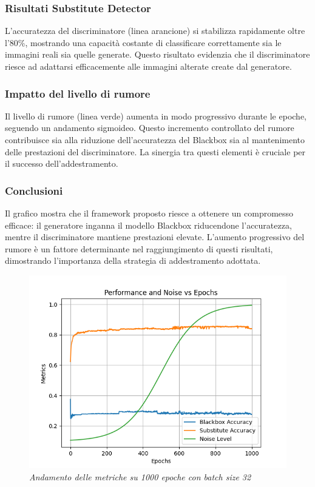 \subsubsection{Risultati Substitute Detector}
L'accuratezza del discriminatore (linea arancione) si stabilizza rapidamente oltre l'80\%, mostrando una capacità costante di classificare correttamente sia le immagini reali sia quelle generate. Questo risultato evidenzia che il discriminatore riesce ad adattarsi efficacemente alle immagini alterate create dal generatore.

\subsubsection{Impatto del livello di rumore}
Il livello di rumore (linea verde) aumenta in modo progressivo durante le epoche, seguendo un andamento sigmoideo. Questo incremento controllato del rumore contribuisce sia alla riduzione dell'accuratezza del Blackbox sia al mantenimento delle prestazioni del discriminatore. La sinergia tra questi elementi è cruciale per il successo dell'addestramento.

\subsubsection{Conclusioni}
Il grafico mostra che il framework proposto riesce a ottenere un compromesso efficace: il generatore inganna il modello Blackbox riducendone l'accuratezza, mentre il discriminatore mantiene prestazioni elevate. L'aumento progressivo del rumore è un fattore determinante nel raggiungimento di questi risultati, dimostrando l'importanza della strategia di addestramento adottata.
\begin{figure}[ht]
    \centering
        \centering
        \includegraphics[width=0.8\linewidth]{images/graph_1000_epochs_32batch.png}
        \caption{\emph{Andamento delle metriche su 1000 epoche con batch size 32}}
        \label{fig:graph_1000_epochs_batch_32}
\end{figure}

